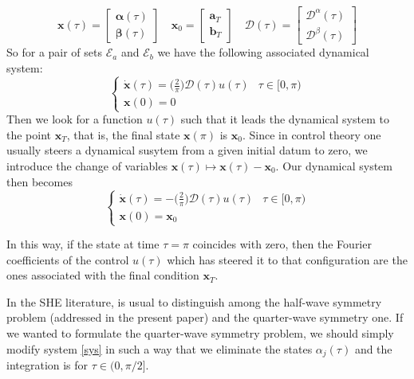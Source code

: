 \begin{equation}
    \bm{x}(\tau) = \begin{bmatrix}
        \bm{\alpha}(\tau) \\  \bm{\beta}(\tau)
    \end{bmatrix} \hspace{1em}
    \bm{x}_0 = \begin{bmatrix}
        \bm{a}_T \\  \bm{b}_T
    \end{bmatrix} \hspace{1em}
    \bm{\mathcal{D}}(\tau) = \begin{bmatrix}
        \bm{\mathcal{D}}^\alpha(\tau) \\  
        \bm{\mathcal{D}}^\beta(\tau)
    \end{bmatrix}     
\end{equation}
So for a pair of sets $ \mathcal {E} _a $ and $ \mathcal {E} _b $ we have the following associated dynamical system:
\begin{equation}
    \begin{cases}
        \dot{\bm{x}}(\tau) = \big(\frac{2}{\pi}\big)\bm{\mathcal{D}}(\tau) u(\tau)  & \tau \in [0,\pi)\\
        \bm{x}(0) = {0}
    \end{cases}
\end{equation}
Then we look for a function $ u (\tau) $ such that it leads the dynamical system to the point $ \bm {x} _T $, that is, the final state $ \bm {x} (\pi) $ is $ \bm {x}_0 $. Since in control theory one usually steers a dynamical susytem from a given initial datum to zero, we introduce the change of variables $\bm{x}(\tau)\mapsto \bm{x}(\tau) - \bm{x}_0$. Our dynamical system then becomes 
\begin{equation}\label{sys}
    \begin{cases}
        \dot{\bm{x}}(\tau) = -\big(\frac{2}{\pi}\big)\bm{\mathcal{D}}(\tau) u(\tau)  & \tau \in [0,\pi)\\
        \bm{x}(0) = \bm{x}_0
    \end{cases}
\end{equation}

In this way, if the state at time $\tau = \pi$ coincides with zero, then the Fourier coefficients of the control $u(\tau)$ which has steered it to that configuration are the ones associated with the final condition $\bm{x}_T$. 

\begin{remark}
In the SHE literature, is usual to distinguish among the half-wave symmetry problem (addressed in the present paper) and the quarter-wave symmetry one. If we wanted to formulate the quarter-wave symmetry problem, we should simply modify system \ref{sys} in such a way that we eliminate the states $\alpha_j(\tau)$ and the integration is for $\tau \in (0,\pi/2]$.
\end{remark}